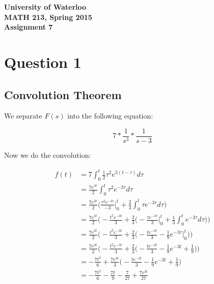 \documentclass[12pt]{article}
\begin{document}
\begin{center}
{\Large\bf University of Waterloo}\\
\vspace{3mm}
{\Large\bf MATH 213, Spring 2015}\\
\vspace{2mm}
{\Large\bf Assignment 7}\\
\end{center}

\section*{Question 1}

\subsection*{Convolution Theorem}

We separate $F(s)$ into the following equation:

$$7 * \frac{1}{s^3} * \frac{1}{s-3}$$

\noindent Now we do the convolution:

\begin{align*}
    f(t) &= 7 \int_0^{t} \frac{1}{2}\tau^2e^{3(t - \tau)} d\tau
      \\ &= \frac{7e^{3t}}{2} \int_0^t \tau^2e^{-3\tau} d\tau
      \\ &= \frac{7e^{3t}}{2}
        \bigg(\frac{\tau^2e^{-3\tau}}{-3} \bigg|_0^t
        + \frac{2}{3} \int_0^t \tau e^{-3\tau} d\tau \bigg)
      \\ &= \frac{7e^{3t}}{2} \bigg(-\frac{t^2e^{-3t}}{3}
        + \frac{2}{3} \bigg(-\frac{\tau e^{-3\tau}}{3} \bigg|_0^t
        + \frac{1}{3} \int_0^t e^{-3\tau} d\tau \bigg) \bigg)
      \\ &= \frac{7e^{3t}}{2} \bigg(-\frac{t^2e^{-3t}}{3}
        + \frac{2}{3} \bigg(-\frac{te^{-3t}}{3}
        - \frac{1}{9} e^{-3\tau} \bigg|_0^t \bigg) \bigg)
      \\ &= \frac{7e^{3t}}{2} \bigg(-\frac{t^2e^{-3t}}{3}
        + \frac{2}{3} \bigg(-\frac{te^{-3t}}{3}
        - \frac{1}{9} e^{-3t} + \frac{1}{9} \bigg) \bigg)
      \\ &= -\frac{7t^2}{6}
        + \frac{7e^{3t}}{3} \bigg(-\frac{te^{-3t}}{3}
        - \frac{1}{9} e^{-3t} + \frac{1}{9} \bigg)
      \\ &= -\frac{7t^2}{6} -\frac{7t}{9}
        - \frac{7}{27} + \frac{7e^{3t}}{27}
\end{align*}
\end{document}
